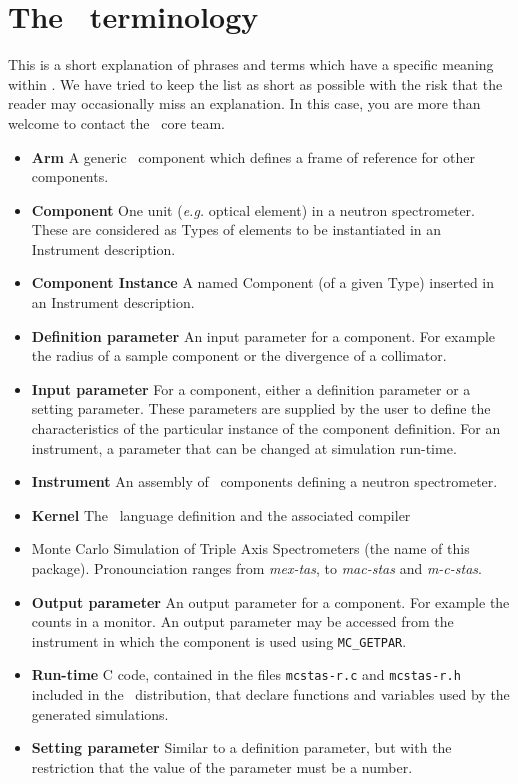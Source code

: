 
\chapter{The \MCS\ terminology}
\label{s:terminology}

This is a short explanation of phrases and terms which have a specific
meaning within \MCS. We have tried to keep the list as short
as possible with the risk that the reader may occasionally miss
an explanation. In this case, you are more than welcome to contact
the \MCS\ core team.

\noindent
\begin{itemize}
\item{\bf Arm}  A generic \MCS\ component which defines a frame of reference
      for other components.
\item{\bf Component} One unit ({\em e.g.} optical element) in a neutron
      spectrometer. These are considered as Types of elements to be instantiated in an Instrument description.
\item{\bf Component Instance} A named Component (of a given Type) inserted in an Instrument description.
\item{\bf Definition parameter} An input parameter for a component. For
  example the radius of a sample component or the divergence of a collimator.
\item{\bf Input parameter} For a component, either a definition parameter
or a setting parameter. These parameters are supplied by the user to
define the characteristics of the particular instance of the component
definition. For an instrument, a parameter that can be changed at
simulation run-time.
\item{\bf Instrument} An assembly of \MCS\ components defining
      a neutron spectrometer.
\item{\bf Kernel} The \MCS\ language definition and the associated compiler
\item{\bf \MCS} Monte Carlo Simulation of Triple Axis Spectrometers
       (the name of this package). Pronounciation ranges from \emph{mex-tas}, to \emph{mac-stas} and \emph{m-c-stas}.
\item{\bf Output parameter} An output parameter for a component.
  For example the counts in a monitor. An output parameter may be
  accessed from the instrument in which the component is used using
  \verb`MC_GETPAR`.
\item{\bf Run-time} C code, contained in the files
  \verb+mcstas-r.c+ and \verb+mcstas-r.h+ included in the \MCS\
  distribution, that declare functions and variables used by the
  generated simulations.
\item{\bf Setting parameter} Similar to a definition parameter, but with the
  restriction that the value of the parameter must be a number.
\end{itemize}

